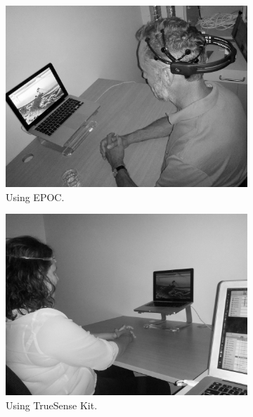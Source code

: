 \documentclass[a4paper,10pt,english,lof,lot,twoside]{puthesis}
\begin{document}
\begin{figure}
\centering
\capstart
\begin{subfigure}[t]{0.35\linewidth}
\centering
\capstart

\includegraphics[width=1.000\linewidth]{experiment-setup-w-epoc.jpg}
\caption[Using EPOC]{Using EPOC.}\label{ch-experiment/index:fig-experiment-setup-w-epoc}\end{subfigure}
\begin{subfigure}[t]{0.35\linewidth}
\centering
\capstart

\includegraphics[width=1.000\linewidth]{experiment-setup-w-truesense.jpg}
\caption[Using TrueSense Kit]{Using TrueSense Kit.}\label{ch-experiment/index:fig-experiment-setup-w-sense}\end{subfigure}
\begin{subfigure}[t]{0.35\linewidth}
\centering
\capstart


\end{subfigure}
\end{figure}
\end{document}
